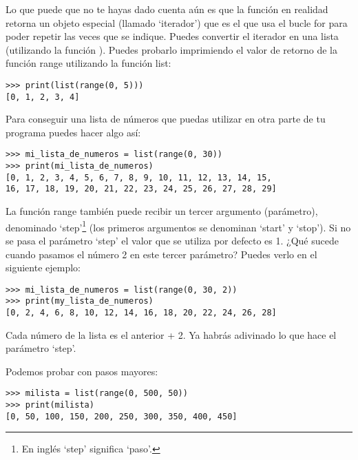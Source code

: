 \noindent
Lo que puede que no te hayas dado cuenta aún es que la función  en realidad retorna un objeto especial (llamado `iterador') que es el que usa el bucle for para poder repetir las veces que se indique.  Puedes convertir el iterador en una lista (utilizando la función ). Puedes probarlo imprimiendo el valor de retorno de la función range utilizando la función list:

\begin{listing}
\begin{verbatim}
>>> print(list(range(0, 5)))
[0, 1, 2, 3, 4]
\end{verbatim}
\end{listing}

\noindent
Para conseguir una lista de números que puedas utilizar en otra parte de tu programa puedes hacer algo así:

\begin{listingignore}
\begin{verbatim}
>>> mi_lista_de_numeros = list(range(0, 30))
>>> print(mi_lista_de_numeros)
[0, 1, 2, 3, 4, 5, 6, 7, 8, 9, 10, 11, 12, 13, 14, 15, 
16, 17, 18, 19, 20, 21, 22, 23, 24, 25, 26, 27, 28, 29]
\end{verbatim}
\end{listingignore}

\noindent
La función range también puede recibir un tercer argumento (parámetro), denominado `step'\footnote{En inglés `step' significa `paso'.} (los primeros argumentos se denominan `start' y `stop').   Si no se pasa el parámetro `step' el valor que se utiliza por defecto es 1.  ¿Qué sucede cuando pasamos el número 2 en este tercer parámetro?   Puedes verlo en el siguiente ejemplo:

\begin{listing}
\begin{verbatim}
>>> mi_lista_de_numeros = list(range(0, 30, 2))
>>> print(my_lista_de_numeros)
[0, 2, 4, 6, 8, 10, 12, 14, 16, 18, 20, 22, 24, 26, 28]
\end{verbatim}
\end{listing}

\noindent
Cada número de la lista es el anterior + 2.   Ya habrás adivinado lo que hace el parámetro `step'.

Podemos probar con pasos mayores:

\begin{listing}
\begin{verbatim}
>>> milista = list(range(0, 500, 50))
>>> print(milista)
[0, 50, 100, 150, 200, 250, 300, 350, 400, 450]
\end{verbatim}
\end{listing}

